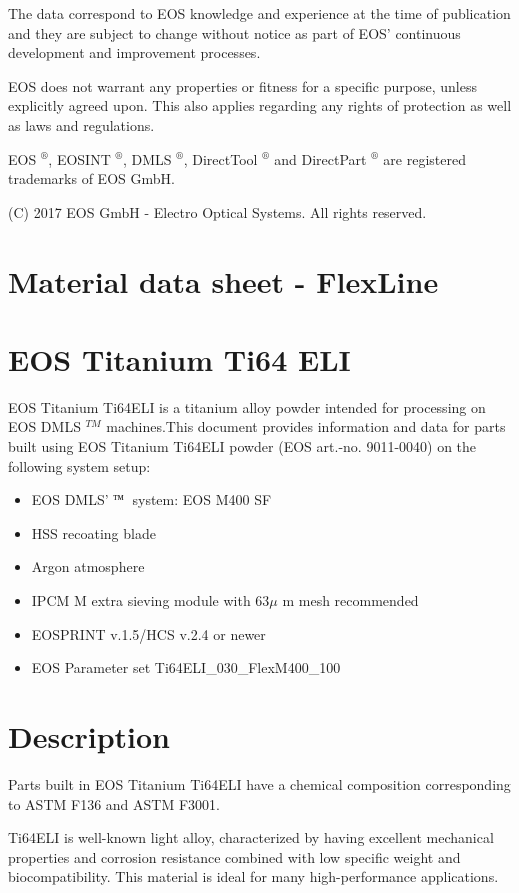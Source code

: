 \documentclass[10pt]{article}
\begin{document}
The data correspond to EOS knowledge and experience at the time of publication and they are subject to change without notice as part of EOS' continuous development and improvement processes.

EOS does not warrant any properties or fitness for a specific purpose, unless explicitly agreed upon. This also applies regarding any rights of protection as well as laws and regulations.

EOS $^{\circledR}$, EOSINT $^{\circledR}$, DMLS $^{\circledR}$, DirectTool $^{\circledR}$ and DirectPart ${ }^{\circledR}$ are registered trademarks of EOS GmbH.

(C) 2017 EOS GmbH - Electro Optical Systems. All rights reserved.

\section*{Material data sheet - FlexLine}
\section*{EOS Titanium Ti64 ELI}
EOS Titanium Ti64ELI is a titanium alloy powder intended for processing on EOS DMLS ${ }^{T M}$ machines.This document provides information and data for parts built using EOS Titanium Ti64ELI powder (EOS art.-no. 9011-0040) on the following system setup:

\begin{itemize}
  \item EOS DMLS' ${ }^{\text {тм }}$ system: EOS M400 SF
  \item HSS recoating blade
  \item Argon atmosphere
  \item IPCM M extra sieving module with $63 \mu$ m mesh recommended
  \item EOSPRINT v.1.5/HCS v.2.4 or newer
  \item EOS Parameter set Ti64ELI\_030\_FlexM400\_100
\end{itemize}

\section*{Description}
Parts built in EOS Titanium Ti64ELI have a chemical composition corresponding to ASTM F136 and ASTM F3001.

Ti64ELI is well-known light alloy, characterized by having excellent mechanical properties and corrosion resistance combined with low specific weight and biocompatibility. This material is ideal for many high-performance applications.
\end{document}
